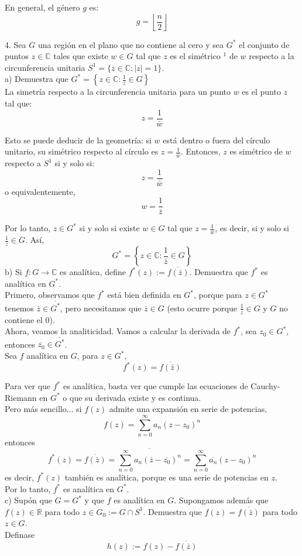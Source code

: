\documentclass{article}
\theoremstyle{nonumberplain}
\begin{document}
En general, el género \( g \) es:
\[
g=\left\lfloor\frac{n}{2}\right\rfloor
\]

4. Sea \( G \) una región en el plano que no contiene al cero y sea \( G^{*} \) el conjunto de puntos \( z \in \mathbb{C} \) tales que existe \( w \in G \) tal que \( z \) es el simétrico \( { }^{1} \) de \( w \) respecto a la circunferencia unitaria \( S^{1}=\{z \in \mathbb{C}:|z|=1\} \). \\
a) Demuestra que \( G^{*}=\left\{z \in \mathbb{C}: \frac{1}{\bar{z}} \in G\right\} \) \\
La simetría respecto a la circunferencia unitaria para un punto \( w \) es el punto \( z \) tal que:
\[
z=\frac{1}{\bar{w}}
\]

Esto se puede deducir de la geometría: si \( w \) está dentro o fuera del círculo unitario, su simétrico respecto al círculo es \( z=\frac{1}{\bar{w}} \). Entonces, \( z \) es simétrico de \( w \) respecto a \( S^{1} \) si y solo si:
\[
z=\frac{1}{\bar{w}}
\]
o equivalentemente,
\[
w=\frac{1}{\bar{z}}
\]

Por lo tanto, \( z \in G^{*} \) si y solo si existe \( w \in G \) tal que \( z=\frac{1}{\bar{w}} \), es decir, si y solo si \( \frac{1}{\bar{z}} \in G \). Así,
\[
G^{*}=\left\{z \in \mathbb{C}: \frac{1}{\bar{z}} \in G\right\}
\]
b) Si \( f: G \rightarrow \mathbb{C} \) es analítica, define \( f^{*}(z):=\overline{f(\bar{z})} \). Demuestra que \( f^{*} \) es analítica en \( G^{*} \). \\
Primero, observamos que \( f^{*} \) está bien definida en \( G^{*} \), porque para \( z \in G^{*} \) tenemos \( \bar{z} \in \overline{G^{*}} \), pero necesitamos que \( \bar{z} \in G \) (esto ocurre porque \( \frac{1}{\bar{z}} \in G \) y \( G \) no contiene el 0). \\

Ahora, veamos la analiticidad. Vamos a calcular la derivada de \( f^{*} \), sea \( z_{0} \in G^{*} \), entonces \( \overline{z_{0}} \in \overline{G^{*}} \). \\
Sea \( f \) analítica en \( G \), para \( z \in G^{*} \),
\[
f^{*}(z)=\overline{f(\bar{z})}
\]

Para ver que \( f^{*} \) es analítica, basta ver que cumple las ecuaciones de Cauchy-Riemann en \( G^{*} \) o que su derivada existe y es continua.  \\

Pero más sencillo... si \( f(z) \) admite una expansión en serie de potencias,
\[
f(z)=\sum_{n=0}^{\infty} a_{n}\left(z-z_{0}\right)^{n}
\]
entonces
\[
f^{*}(z)=\overline{f(\bar{z})}=\overline{\sum_{n=0}^{\infty} a_{n}\left(\bar{z}-\overline{z_{0}}\right)^{n}}=\sum_{n=0}^{\infty} \overline{a_{n}}\left(z-z_{0}\right)^{n}
\]
es decir, \( f^{*}(z) \) también es analítica, porque es una serie de potencias en \( z \). \\
Por lo tanto, \( f^{*} \) es analítica en \( G^{*} \).\\
c) Supón que \( G=G^{*} \) y que \( f \) es analítica en \( G \). Supongamos además que \( f(z) \in \mathbb{R} \) para todo \( z \in G_{0}:=G \cap S^{1} \). Demuestra que \( f(z)=\overline{f(\bar{z})} \) para todo \( z \in G \). \\
Definase
\[
h(z):=f(z)-\overline{f(\bar{z})}
\]
\end{document}
